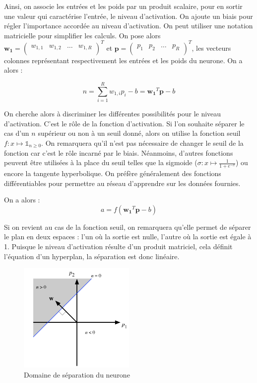 Ainsi, on associe les entrées et les poids par un produit scalaire, pour en sortir une valeur qui caractérise l'entrée, le niveau d'activation.
On ajoute un biais pour régler l'importance accordée au niveau d'activation. On peut utiliser une notation matricielle pour simplifier les calculs.
On pose alors $\mathbf{w_1} = 
\begin{pmatrix}
  w_{1,1} & w_{1,2} & \ldots & w_{1,R}\\
\end{pmatrix}^T $ 
et
$ \mathbf{p} = 
\begin{pmatrix}
 p_1 & p_2 & \ldots & p_R \\
\end{pmatrix}^T $, 
les vecteurs colonnes représentant respectivement les entrées et les poids du neurone. On a alors :

\begin{equation} 
n = \sum_{i=1}^{R} w_{1,i} p_i - b = \mathbf{w_1}^T \mathbf{p} - b
\end{equation}

On cherche alors à discriminer les différentes possibilités pour le niveau d'activation. C'est le rôle de la fonction d'activation. Si l'on souhaite séparer
le cas d'un $n$ supérieur ou non à un seuil donné, alors on utilise la fonction seuil $ f : x \mapsto \mathds{1}_{n \geq 0} $. On remarquera qu'il n'est 
pas nécessaire de changer le seuil de la fonction car c'est le rôle incarné par le biais. Néanmoins, d'autres fonctions peuvent être utilisées à la place
du seuil telles que la sigmoide ($\sigma : x \mapsto \frac{1}{1+e^{-x}}$) ou encore la tangente hyperbolique. 
On préfère généralement des fonctions différentiables pour permettre au réseau d'apprendre sur les données fournies.

On a alors : 
\begin{equation}
 a = f\left(\mathbf{w_1}^T \mathbf{p} - b\right)
\end{equation}

Si on revient au cas de la fonction seuil, on remarquera qu'elle permet de séparer le plan en deux espaces : l'un où la sortie est nulle, l'autre où
la sortie est égale à 1. Puisque le niveau d'activation résulte d'un produit matriciel, cela définit l'équation d'un hyperplan, la séparation
est donc linéaire.

\begin{figure}[h]
 \centering
 \includegraphics[width=0.5\textwidth]{img/separation_lineaire_du_plan.png}
 \caption{Domaine de séparation du neurone}
\end{figure}

